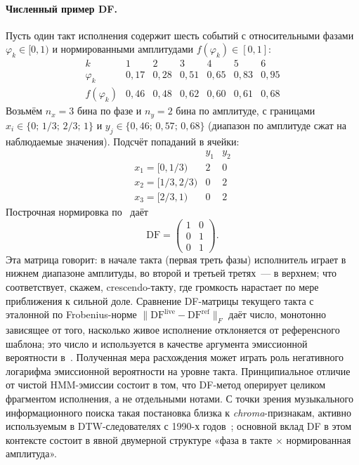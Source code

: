 \paragraph*{Численный пример DF.} Пусть один такт исполнения
содержит шесть событий с относительными фазами
$\varphi_k\in[0,1)$ и нормированными амплитудами
$f(\varphi_k)\in[0,1]$:
\begin{equation*}
\begin{array}{c|cccccc}
k & 1 & 2 & 3 & 4 & 5 & 6 \\
\hline
\varphi_k & 0{,}17 & 0{,}28 & 0{,}51 & 0{,}65 & 0{,}83 & 0{,}95 \\
f(\varphi_k) & 0{,}46 & 0{,}48 & 0{,}62 & 0{,}60 & 0{,}61 & 0{,}68
\end{array}
\end{equation*}
Возьмём $n_x=3$ бина по фазе и $n_y=2$ бина по амплитуде,
с границами $x_i\in\{0;\,1/3;\,2/3;\,1\}$ и
$y_j\in\{0{,}46;\,0{,}57;\,0{,}68\}$ (диапазон по
амплитуде сжат на наблюдаемые значения). Подсчёт попаданий в
ячейки:
\begin{equation*}
\begin{array}{c|cc}
& y_1 & y_2 \\
\hline
x_1 = [0, 1/3) & 2 & 0 \\
x_2 = [1/3, 2/3) & 0 & 2 \\
x_3 = [2/3, 1) & 0 & 2
\end{array}
\end{equation*}
Построчная нормировка по~ даёт
\begin{equation*}
\mathrm{DF} =
\begin{pmatrix}
1 & 0 \\
0 & 1 \\
0 & 1
\end{pmatrix}.
\end{equation*}
Эта матрица говорит: в начале такта (первая треть фазы)
исполнитель играет в нижнем диапазоне амплитуды, во второй и
третьей третях~--- в верхнем; что соответствует, скажем,
crescendo-такту, где громкость нарастает по мере приближения к
сильной доле. Сравнение DF-матрицы текущего такта с эталонной
по Frobenius-норме $\|\mathrm{DF}^{\text{live}} -
\mathrm{DF}^{\text{ref}}\|_F$ даёт число, монотонно
зависящее от того, насколько живое исполнение отклоняется от
референсного шаблона; это число и используется в качестве
аргумента эмиссионной вероятности в~. Полученная мера расхождения может играть роль
негативного логарифма эмиссионной вероятности на уровне такта.
Принципиальное отличие от чистой HMM-эмиссии состоит в том, что
DF-метод оперирует целиком фрагментом исполнения, а не
отдельными нотами. С точки зрения музыкального
информационного поиска такая постановка близка к
\textit{chroma}-признакам, активно используемым в DTW-следователях
с 1990-х годов~\cite{Mueller2007,MullerFMP2015}; основной вклад
DF в этом контексте состоит в явной двумерной структуре «фаза в
такте × нормированная амплитуда».

